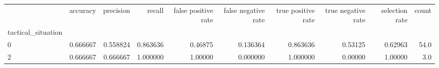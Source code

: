\begin{tabular}{lrrrrrrrrr}
\toprule
{} &  accuracy &  precision &    recall &  false positive rate &  false negative rate &  true positive rate &  true negative rate &  selection rate &  count \\
tactical\_situation &           &            &           &                      &                      &                     &                     &                 &        \\
\midrule
0                  &  0.666667 &   0.558824 &  0.863636 &              0.46875 &             0.136364 &            0.863636 &             0.53125 &         0.62963 &   54.0 \\
2                  &  0.666667 &   0.666667 &  1.000000 &              1.00000 &             0.000000 &            1.000000 &             0.00000 &         1.00000 &    3.0 \\
\bottomrule
\end{tabular}
